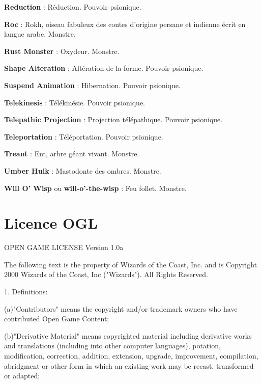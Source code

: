 \documentclass[11pt]{article}
\begin{document}
{{\textbf{Reduction} : Réduction. Pouvoir psionique.

\textbf{Roc} : Rokh, oiseau fabuleux des contes d'origine persane et indienne écrit en langue arabe. Monstre.

\textbf{Rust Monster} : Oxydeur. Monstre.

\textbf{Shape Alteration} : Altération de la forme. Pouvoir psionique.

\textbf{Suspend Animation} : Hibernation. Pouvoir psionique.

\textbf{Telekinesis} : Télékinésie. Pouvoir psionique.

\textbf{Telepathic Projection} : Projection télépathique. Pouvoir psionique.

\textbf{Teleportation} : Téléportation. Pouvoir psionique.

\textbf{Treant} : Ent, arbre géant vivant. Monstre.

\textbf{Umber Hulk} : Mastodonte des ombres. Monstre.

\textbf{Will O’ Wisp} ou \textbf{will-o'-the-wisp} : Feu follet. Monstre.

}%


\newpage
{}\section*{Licence OGL}

OPEN GAME LICENSE Version 1.0a

\bigskip

The following text is the property of Wizards of the Coast, Inc. and is Copyright 2000 Wizards of the Coast, Inc ("Wizards"). All Rights Reserved.

\bigskip

1. Definitions:

\bigskip

(a)"Contributors" means the copyright and/or trademark owners who have contributed Open Game Content;

\bigskip

(b)"Derivative Material" means copyrighted material including derivative works and translations (including into other computer languages), potation, modification, correction, addition, extension, upgrade, improvement, compilation, abridgment or other form in which an existing work may be recast, transformed or adapted;

}
\end{document}
